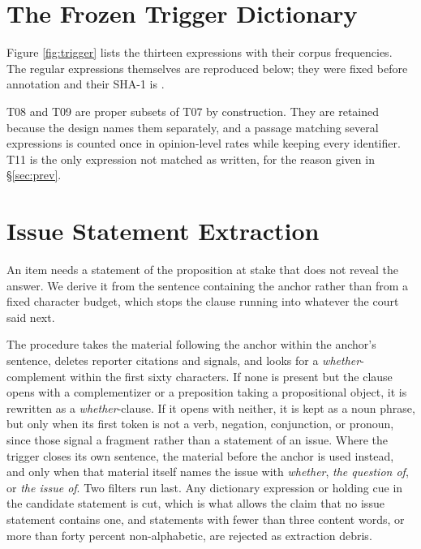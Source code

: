 

\section{The Frozen Trigger Dictionary}
\label{app:dict}

Figure \ref{fig:trigger} lists the thirteen expressions with
their corpus frequencies. The regular expressions themselves are reproduced
below; they were fixed before annotation and their SHA-1 is \texttt{\DictSHA}.



T08 and T09 are proper subsets of T07 by construction. They are retained because
the design names them separately, and a passage matching several expressions is
counted once in opinion-level rates while keeping every identifier. T11 is the
only expression not matched as written, for the reason given in
\S\ref{sec:prev}.

\section{Issue Statement Extraction}
\label{app:issue}

An item needs a statement of the proposition at stake that does not reveal the
answer. We derive it from the sentence containing the anchor rather than from a
fixed character budget, which stops the clause running into whatever the court
said next.

The procedure takes the material following the anchor within the anchor's
sentence, deletes reporter citations and signals, and looks for a
\emph{whether}-complement within the first sixty characters. If none is present
but the clause opens with a complementizer or a preposition taking a
propositional object, it is rewritten as a \emph{whether}-clause. If it opens
with neither, it is kept as a noun phrase, but only when its first token is not a
verb, negation, conjunction, or pronoun, since those signal a fragment rather
than a statement of an issue. Where the trigger closes its own sentence, the
material before the anchor is used instead, and only when that material itself
names the issue with \emph{whether}, \emph{the question of}, or \emph{the issue
of}. Two filters run last. Any dictionary expression or holding cue in the
candidate statement is cut, which is what allows the claim that no issue
statement contains one, and statements with fewer than three content words, or
more than forty percent non-alphabetic, are rejected as extraction debris.

